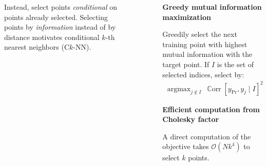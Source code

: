 \documentclass{beamer}                             %
\newcommand{\blocktitle}[1]{{\Large \textbf{#1}}}
\newcommand*{\BigO}{\mathcal{O}}
\renewcommand*{\I}{I}
\DeclareMathOperator*{\argmax}{argmax}
\newcommand*{\Pred}{\mathrm{Pr}}
\DeclareMathOperator{\Corr}{\mathbb{C}orr}
\begin{document}
\begin{frame}[t]
\begin{columns}[T]
\begin{column}{0.30\textwidth}
\begin{tcolorbox}
\begin{columns}
\begin{column}{0.5\textwidth}
        \vspace{\baselineskip}
        Instead, select points \emph{conditional} on points already selected.
        Selecting points by \emph{information} instead of by distance
        motivates conditional \( k \)-th nearest neighbors (C\( k \)-NN).
      \end{column}
      \begin{column}{0.5\textwidth}
        \begin{figure}[t]
          \centering
          
          \label{fig:selection_cknn}
        \end{figure}
      \end{column}
    \end{columns}
  \end{tcolorbox}
\end{column}

\begin{column}{0.01\textwidth}
  \begin{center}
    \textcolor{darksilver}{\rule[-1cm]{1mm}{0.8\textheight}}
  \end{center}
\end{column}


\begin{column}{0.30\textwidth}
  \begin{tcolorbox}
    \blocktitle{Greedy mutual information maximization}

    Greedily select the next training point with highest mutual
    information with the target point. If \( \I \) is the set
    of selected indices, select by:
    \begin{align*}
      \argmax_{j \not \in \I} \: \Corr[y_\Pred, y_j \mid \I]^2
    \end{align*}
  \end{tcolorbox}

  \begin{tcolorbox}
    \blocktitle{Efficient computation from Cholesky factor}

    A direct computation of the objective takes \(
    \BigO(N k^4) \) to select \( k \) points.


\end{tcolorbox}
\end{column}
\end{columns}
\end{frame}
\end{document}
